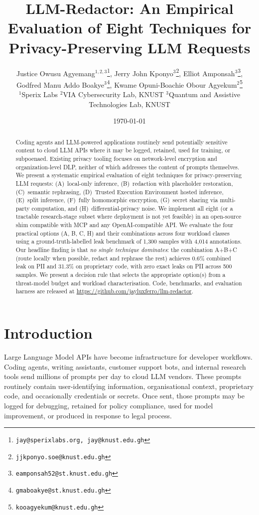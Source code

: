 \documentclass[11pt,a4paper]{article}
\title{%
  LLM-Redactor: An Empirical Evaluation of Eight Techniques for
  Privacy-Preserving LLM Requests
}
\author{%
Justice Owusu Agyemang$^{1,2,3}$\thanks{\texttt{jay@sperixlabs.org, jay@knust.edu.gh}},\quad
Jerry John Kponyo$^{3}$\thanks{\texttt{jjkponyo.soe@knust.edu.gh}},\quad
Elliot Amponsah$^{3}$\thanks{\texttt{eamponsah52@st.knust.edu.gh}},\\
Godfred Manu Addo Boakye$^{3}$\thanks{\texttt{gmaboakye@st.knust.edu.gh}},\quad
Kwame Opuni-Boachie Obour Agyekum$^{2}$\thanks{\texttt{kooagyekum@knust.edu.gh}}\\[4pt]
{\small $^1$Sperix Labs \qquad $^2$VIA Cybersecurity Lab, KNUST \qquad $^3$Quantum and Assistive Technologies Lab, KNUST}%
}
\date{\today}
\begin{document}
\maketitle

\begin{abstract}
Coding agents and LLM-powered applications routinely send
potentially sensitive content to cloud LLM APIs where it may be
logged, retained, used for training, or subpoenaed. Existing
privacy tooling focuses on network-level encryption and
organization-level DLP, neither of which addresses the content of
prompts themselves. We present a systematic empirical evaluation of
eight techniques for privacy-preserving LLM requests: (A)~local-only
inference, (B)~redaction with placeholder restoration, (C)~semantic
rephrasing, (D)~Trusted Execution Environment hosted inference,
(E)~split inference, (F)~fully homomorphic encryption, (G)~secret
sharing via multi-party computation, and (H)~differential-privacy
noise. We implement all eight (or a tractable research-stage
subset where deployment is not yet feasible) in an open-source shim
compatible with MCP and any OpenAI-compatible API. We evaluate the
four practical options (A, B, C, H) and their combinations across
four workload classes using a ground-truth-labelled leak benchmark
of 1{,}300 samples with 4{,}014 annotations. Our headline finding
is that \emph{no single technique dominates}: the combination A+B+C (route locally when possible, redact and
rephrase the rest) achieves 0.6\% combined leak on PII and
31.3\% on proprietary code, with zero exact leaks on PII
across 500 samples. We present a decision rule that selects the
appropriate option(s) from a threat-model budget and workload
characterisation. Code, benchmarks, and evaluation harness are
released at \url{https://github.com/jayluxferro/llm-redactor}.
\end{abstract}

\section{Introduction}
\label{sec:intro}

Large Language Model APIs have become infrastructure for
developer workflows. Coding agents, writing assistants, customer
support bots, and internal research tools send millions of prompts
per day to cloud LLM vendors. These prompts routinely contain
user-identifying information, organisational context, proprietary
code, and occasionally credentials or secrets. Once sent, those
prompts may be logged for debugging, retained for policy
compliance, used for model improvement, or produced in response to
legal process.
\end{document}
